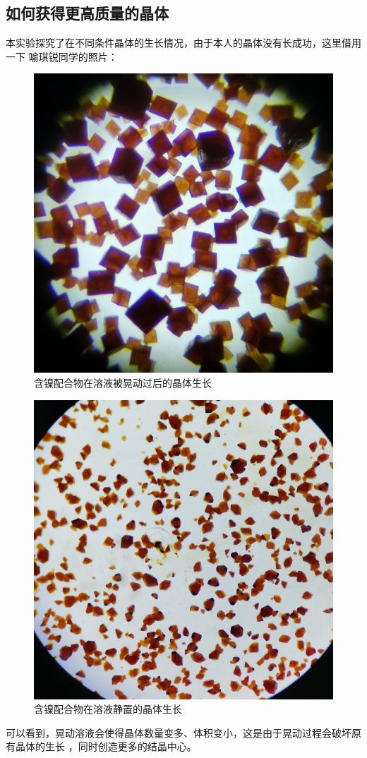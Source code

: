 \documentclass[a4paper,zihao=5,UTF8]{ctexart}
\begin{document}
	\subsection{如何获得更高质量的晶体}
	本实验探究了在不同条件晶体的生长情况，由于本人的晶体没有长成功，这里借用一下
	喻琪锐同学的照片：
	\begin{figure}[htbp]
		\centering
		\includegraphics[scale=0.10]{Ni_YQR_T.jpg}
		\caption{含镍配合物在溶液被晃动过后的晶体生长}
	\end{figure}
	\begin{figure}[htbp]
		\centering
		\includegraphics[scale=0.10]{Ni_YQR_N.jpg}
		\caption{含镍配合物在溶液静置的晶体生长}
	\end{figure}
	可以看到，晃动溶液会使得晶体数量变多、体积变小，这是由于晃动过程会破坏原有晶体的生长
	，同时创造更多的结晶中心。
	
	
\end{document}
